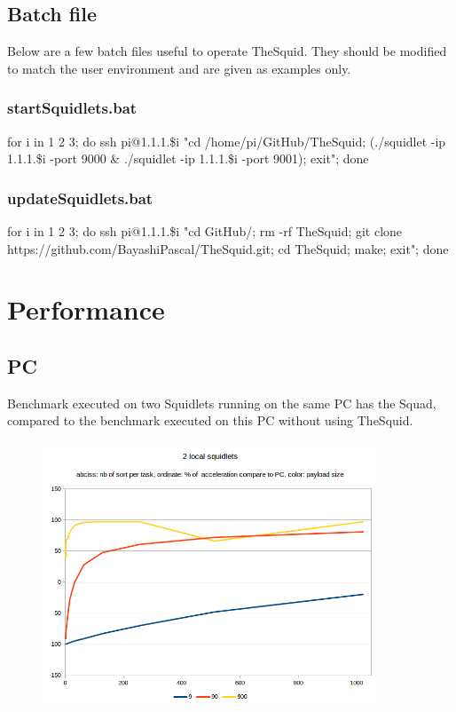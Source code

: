 \subsection{Batch file}

Below are a few batch files useful to operate TheSquid. They should be modified to match the user environment and are given as examples only.

\subsubsection{startSquidlets.bat}

\begin{ttfamily}
for i in 1 2 3; do 
ssh pi@1.1.1.\$i "cd /home/pi/GitHub/TheSquid; 
(./squidlet -ip 1.1.1.\$i -port 9000 & 
./squidlet -ip 1.1.1.\$i -port 9001); exit"; 
done
\end{ttfamily}

\subsubsection{updateSquidlets.bat}

\begin{ttfamily}
for i in 1 2 3; do 
ssh pi@1.1.1.\$i "cd GitHub/; rm -rf TheSquid; 
git clone https://github.com/BayashiPascal/TheSquid.git; 
cd TheSquid; make; exit"; done
\end{ttfamily}

\section{Performance}

\subsection{PC}

Benchmark executed on two Squidlets running on the same PC has the Squad, compared to the benchmark executed on this PC without using TheSquid.

\begin{center}
\begin{figure}[H]
\centering\includegraphics[width=10cm]{./benchmark01.png}\\
\end{figure}
\end{center}

